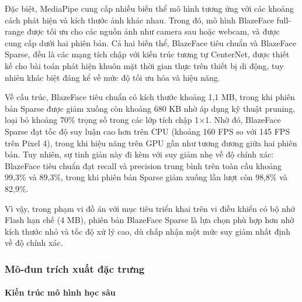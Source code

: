 Đặc biệt, MediaPipe cung cấp nhiều biến thể mô hình tương ứng với các khoảng cách phát hiện và kích thước ảnh khác nhau. Trong đó, mô hình BlazeFace full-range được tối ưu cho các nguồn ảnh như camera sau hoặc webcam, và được cung cấp dưới hai phiên bản. Cả hai biến thể, BlazeFace tiêu chuẩn và BlazeFace Sparse\cite{bazarevsky2019blazeface}, đều là các mạng tích chập với kiến trúc tương tự CenterNet, được thiết kế cho bài toán phát hiện khuôn mặt thời gian thực trên thiết bị di động, tuy nhiên khác biệt đáng kể về mức độ tối ưu hóa và hiệu năng.

Về cấu trúc, BlazeFace tiêu chuẩn có kích thước khoảng 1,1 MB, trong khi phiên bản Sparse được giảm xuống còn khoảng 680 KB nhờ áp dụng kỹ thuật pruning, loại bỏ khoảng 70\% trọng số trong các lớp tích chập 1×1. Nhờ đó, BlazeFace Sparse đạt tốc độ suy luận cao hơn trên CPU (khoảng 160 FPS so với 145 FPS trên Pixel 4), trong khi hiệu năng trên GPU gần như tương đương giữa hai phiên bản. Tuy nhiên, sự tinh giản này đi kèm với suy giảm nhẹ về độ chính xác: BlazeFace tiêu chuẩn đạt recall và precision trung bình trên toàn cầu khoảng 99,3\% và 89,3\%, trong khi phiên bản Sparse giảm xuống lần lượt còn 98,8\% và 82,9\%.

Vì vậy, trong phạm vi đồ án với mục tiêu triển khai trên vi điều khiển có bộ nhớ Flash hạn chế (4 MB), phiên bản BlazeFace Sparse là lựa chọn phù hợp hơn nhờ kích thước nhỏ và tốc độ xử lý cao, dù chấp nhận một mức suy giảm nhất định về độ chính xác.
\subsubsection{Mô-đun trích xuất đặc trưng}
\paragraph{Kiến trúc mô hình học sâu}

